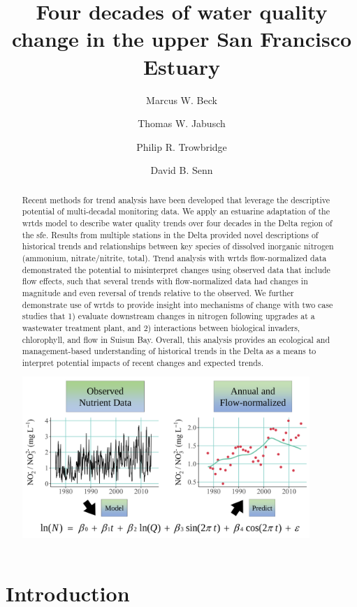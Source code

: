 \documentclass[journal = esthag, manuscript = article]{achemso}\usepackage[]{graphicx}\usepackage[]{color}
\author{Marcus W. Beck}
\affiliation{USEPA National Health and Environmental Effects Research Laboratory, Gulf Ecology Division, Gulf Breeze, FL}
\author{Thomas W. Jabusch}
\author{Philip R. Trowbridge}
\author{David B. Senn}
\affiliation{San Francisco Estuary Institute, Richmond, CA}
\title[Water quality change in the upper SFE]{Four decades of water quality change in the upper San Francisco Estuary}
\begin{document}
\linenumbers

\begin{abstract}
\noindent Recent methods for trend analysis have been developed that leverage the descriptive potential of multi-decadal monitoring data.  We apply an estuarine adaptation of the \ac{wrtds} model to describe water quality trends over four decades in the Delta region of the \ac{sfe}. Results from multiple stations in the Delta provided novel descriptions of historical trends and relationships between key species of dissolved inorganic nitrogen (ammonium, nitrate/nitrite, total).  Trend analysis with \ac{wrtds} flow-normalized data demonstrated the potential to misinterpret changes using observed data that include flow effects, such that several trends with flow-normalized data had changes in magnitude and even reversal of trends relative to the observed.  We further demonstrate use of \ac{wrtds} to provide insight into mechanisms of change with two case studies that 1) evaluate downstream changes in nitrogen following upgrades at a wastewater treatment plant, and 2) interactions between biological invaders, chlorophyll, and flow in Suisun Bay.  Overall, this analysis provides an ecological and management-based understanding of historical trends in the Delta as a means to interpret potential impacts of recent changes and expected trends.

\centerline{\includegraphics[width=0.9\textwidth]{figs/tocabs.pdf}}
\end{abstract}
\acresetall

\section{Introduction}
\end{document}
